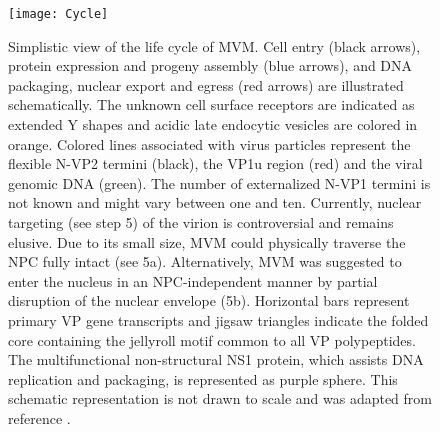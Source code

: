 \begin{figure}
\centering
  \texttt{[image: Cycle]}
  \caption[Life cycle of MVM]
   {Simplistic view of the life cycle of MVM. Cell entry (black arrows), protein expression and progeny assembly (blue arrows), and DNA packaging, nuclear export and egress (red arrows) are illustrated schematically. The unknown cell surface receptors are indicated as extended Y shapes and acidic late endocytic vesicles are colored in orange. Colored lines associated with virus particles represent the flexible N-VP2 termini (black), the VP1u region (red) and the viral genomic DNA (green). The number of externalized N-VP1 termini is not known and might vary between one and ten. Currently, nuclear targeting (see step 5) of the virion is controversial and remains elusive. Due to its small size, MVM could physically traverse the NPC fully intact (see 5a). Alternatively, MVM was suggested to enter the nucleus in an NPC-independent manner by partial disruption of the nuclear envelope (5b). Horizontal bars represent primary VP gene transcripts and jigsaw triangles indicate the folded core containing the jellyroll motif common to all VP polypeptides. The multifunctional non-structural NS1 protein, which assists DNA replication and packaging, is represented as purple sphere. This schematic representation is not drawn to scale and was adapted from reference \cite{small}.  
} 
\label{Cycle}
\end{figure}






    


